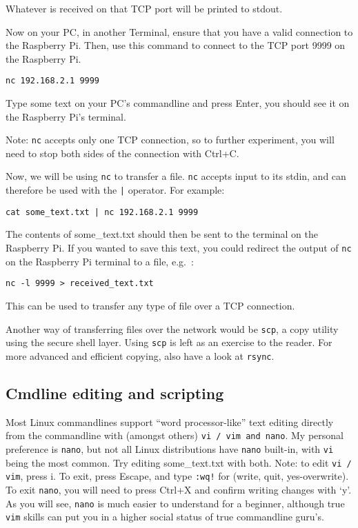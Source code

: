 \documentclass[a4paper]{article}
\begin{document}
Whatever is received on that TCP port will be printed to stdout. 


Now on your PC, in another Terminal, ensure that you have a valid connection to the Raspberry Pi. Then, use this command to connect to the TCP port 9999 on the Raspberry Pi. 
\begin{lstlisting}
nc 192.168.2.1 9999
\end{lstlisting}
Type some text on your PC's commandline and press Enter, you should see it on the Raspberry Pi's terminal. 

Note: \texttt{nc} accepts only one TCP connection, so to further experiment, you will need to stop both sides of the connection with Ctrl+C. 

Now, we will be using \texttt{nc} to transfer a file. \texttt{nc} accepts input to its stdin, and can therefore be used with the \texttt{|} operator. For example: 
\begin{lstlisting}
cat some_text.txt | nc 192.168.2.1 9999
\end{lstlisting}
The contents of some\_text.txt should then be sent to the terminal on the Raspberry Pi. If you wanted to save this text, you could redirect the output of \texttt{nc} on the Raspberry Pi terminal to a file, e.g.\ :
\begin{lstlisting}
nc -l 9999 > received_text.txt
\end{lstlisting}
This can be used to transfer any type of file over a TCP connection. 

Another way of transferring files over the network would be \texttt{scp}, a copy utility using the secure shell layer. Using \texttt{scp} is left as an exercise to the reader. For more advanced and efficient copying, also have a look at \texttt{rsync}.

\subsection{Cmdline editing and scripting}
Most Linux commandlines support ``word processor-like'' text editing directly from the commandline with (amongst others) \texttt{vi / vim and nano}. My personal preference is \texttt{nano}, but not all Linux distributions have \texttt{nano} built-in, with \texttt{vi} being the most common. Try editing some\_text.txt with both. 
Note: to edit \texttt{vi / vim}, press i. To exit, press Escape, and type \texttt{:wq!} for (write, quit, yes-overwrite). To exit \texttt{nano}, you will need to press Ctrl+X and confirm writing changes with `y'. As you will see, \texttt{nano} is much easier to understand for a beginner, although true \texttt{vim} skills can put you in a higher social status of true commandline guru's.
\end{document}

